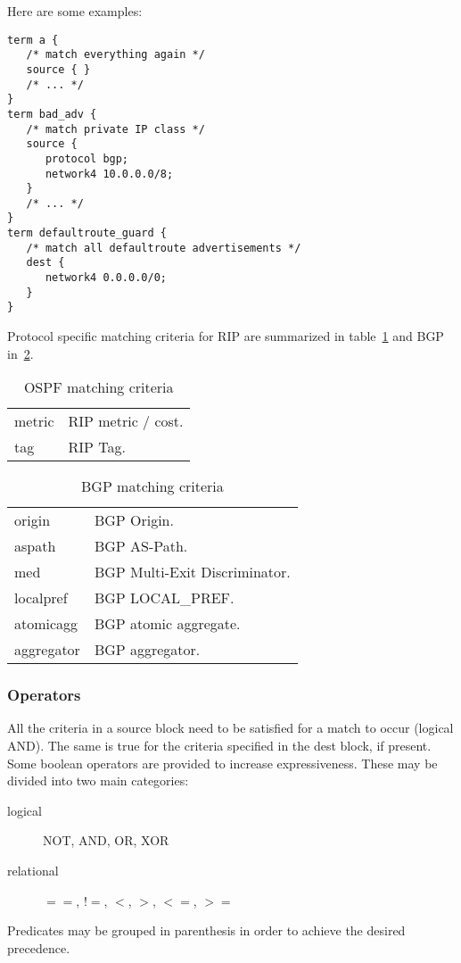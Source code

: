 \documentclass{article}
\begin{document}
Here are some examples:
\begin{verbatim}
term a {
   /* match everything again */
   source { }
   /* ... */
}
term bad_adv {
   /* match private IP class */
   source {
      protocol bgp;
      network4 10.0.0.0/8;
   }
   /* ... */
}
term defaultroute_guard {
   /* match all defaultroute advertisements */
   dest {
      network4 0.0.0.0/0;
   }
}
\end{verbatim}

Protocol specific matching criteria for RIP are summarized in
table~\ref{matchrip} and BGP in~\ref{matchbgp}.

\begin{table}
\begin{tabular}{l l}
metric		& RIP metric / cost. \\
tag		& RIP Tag. \\
\end{tabular}
\caption{\label{matchrip}OSPF matching criteria}
\end{table}

\begin{table}
\begin{tabular}{l l}
origin		& BGP Origin. \\
aspath		& BGP AS-Path. \\
med		& BGP Multi-Exit Discriminator. \\
localpref	& BGP LOCAL\_PREF. \\
atomicagg	& BGP atomic aggregate. \\
aggregator	& BGP aggregator. \\
\end{tabular}
\caption{\label{matchbgp}BGP matching criteria}
\end{table}


\subsubsection{Operators}
All the criteria in a source block need to be satisfied for a match to occur
(logical AND). The same is true for the criteria specified in the dest block, if
present. Some boolean operators are provided to increase expressiveness.  These
may be divided into two main categories:
\begin{description}
\item[logical] NOT, AND, OR, XOR
\item[relational] $==$, $!=$, $<$, $>$, $<=$, $>=$
\end{description}
Predicates may be grouped in parenthesis in order to achieve the desired precedence.
\end{document}
